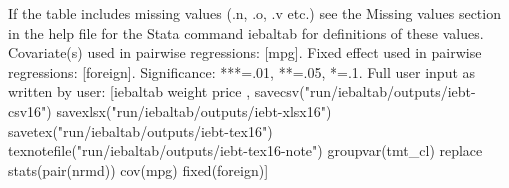If the table includes missing values (.n, .o, .v etc.) see the Missing values section in the help file for the Stata command iebaltab for definitions of these values. Covariate(s) used in pairwise regressions: [mpg]. Fixed effect used in pairwise regressions: [foreign]. Significance: ***=.01, **=.05, *=.1. Full user input as written by user: [iebaltab weight price , savecsv("run/iebaltab/outputs/iebt-csv16") savexlsx("run/iebaltab/outputs/iebt-xlsx16") savetex("run/iebaltab/outputs/iebt-tex16") texnotefile("run/iebaltab/outputs/iebt-tex16-note") groupvar(tmt\_cl) replace stats(pair(nrmd)) cov(mpg) fixed(foreign)] 
